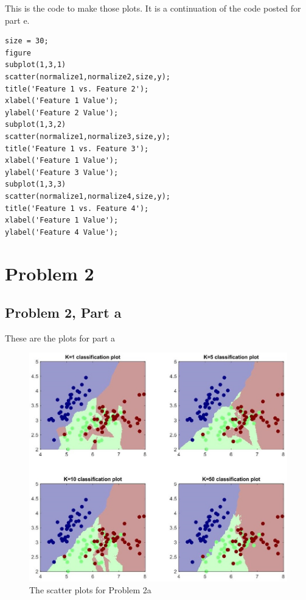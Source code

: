 \documentclass[11pt,psfig]{article}
\begin{document}
This is the code to make those plots. It is a continuation of the code posted for part e. 
\begin{verbatim}
size = 30;
figure
subplot(1,3,1)
scatter(normalize1,normalize2,size,y);
title('Feature 1 vs. Feature 2');
xlabel('Feature 1 Value');
ylabel('Feature 2 Value');
subplot(1,3,2)
scatter(normalize1,normalize3,size,y);
title('Feature 1 vs. Feature 3');
xlabel('Feature 1 Value');
ylabel('Feature 3 Value');
subplot(1,3,3)
scatter(normalize1,normalize4,size,y);
title('Feature 1 vs. Feature 4');
xlabel('Feature 1 Value');
ylabel('Feature 4 Value');
\end{verbatim}

\newpage

\section*{Problem 2}

\subsection*{Problem 2, Part a}

These are the plots for part a

\begin{figure}[H]
\centering
\includegraphics[width=\columnwidth]{prob2aPlots.jpg}
\caption{The scatter plots for Problem 2a}
\end{figure}
\end{document}

